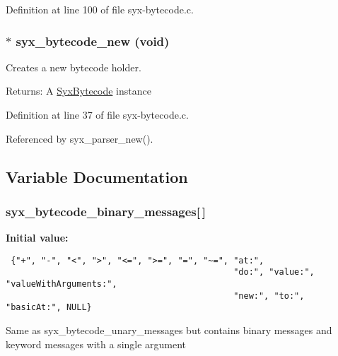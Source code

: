 Definition at line 100 of file syx-bytecode.c.\hypertarget{syx-bytecode_8c_66169f5d9d84f663e2f04aba3502f179}{
\subsubsection{$\ast$ syx\_\-bytecode\_\-new (void)}}
\label{syx-bytecode_8c_66169f5d9d84f663e2f04aba3502f179}


Creates a new bytecode holder.

\begin{Desc}
\item[Returns:]A \hyperlink{struct_syx_bytecode}{SyxBytecode} instance \end{Desc}


Definition at line 37 of file syx-bytecode.c.

Referenced by syx\_\-parser\_\-new().

\subsection{Variable Documentation}
\hypertarget{syx-bytecode_8c_90d7e46b6b031c996ce7cc81083a6fa7}{
\subsubsection{ {\bf syx\_\-bytecode\_\-binary\_\-messages}\mbox{[}$\,$\mbox{]}}}
\label{syx-bytecode_8c_90d7e46b6b031c996ce7cc81083a6fa7}


\textbf{Initial value:}

\begin{Code}\begin{verbatim} {"+", "-", "<", ">", "<=", ">=", "=", "~=", "at:",
                                             "do:", "value:", "valueWithArguments:",
                                             "new:", "to:", "basicAt:", NULL}
\end{verbatim}
\end{Code}
Same as syx\_\-bytecode\_\-unary\_\-messages but contains binary messages and keyword messages with a single argument 

